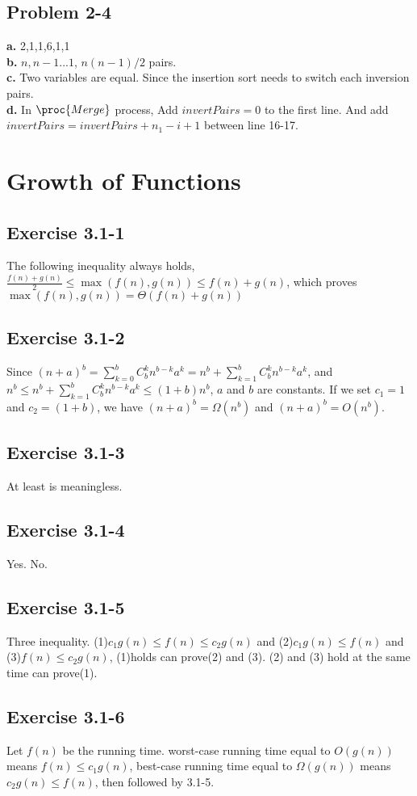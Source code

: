 \documentclass[12pt]{article}
\theoremstyle{definition}
\theoremstyle{remark}
\begin{document}
\subsection*{Problem 2-4}
\textbf{a.} 2,1,1,6,1,1\qquad \\
\textbf{b.} ${n,n-1...1}$, $n(n-1)/2$ pairs.\\
\textbf{c.} Two variables are equal. Since the insertion sort needs to switch each inversion pairs.\\
\textbf{d.} In $\proc{Merge}$ process, Add $invertPairs=0$ to the first line. And add $invertPairs=invertPairs+n_1-i+1$ between line 16-17.
\section{Growth of Functions}
\subsection*{Exercise 3.1-1}
The following inequality always holds, $\frac{f(n)+g(n)}{2}\le \max(f(n),g(n))\le f(n)+g(n)$, which proves $\max(f(n),g(n))=\Theta(f(n)+g(n))$
\subsection*{Exercise 3.1-2}
Since $(n+a)^b=\sum\limits_{k=0}^b C^k_b n^{b-k}a^k=n^b+\sum\limits_{k=1}^b C^k_b n^{b-k}a^k$, and $n^b\le n^b+\sum\limits_{k=1}^b C^k_b n^{b-k}a^k\le (1+b)n^b$, $a$ and $b$ are constants. If we set $c_1=1$ and $c_2=(1+b)$, we have $(n+a)^b=\Omega(n^b)$ and $(n+a)^b=O(n^b)$.
\subsection*{Exercise 3.1-3}
At least is meaningless.
\subsection*{Exercise 3.1-4}
Yes. No.
\subsection*{Exercise 3.1-5}
Three inequality. (1)$c_1g(n)\le f(n)\le c_2g(n)$ and (2)$c_1g(n)\le f(n)$ and (3)$f(n)\le c_2g(n)$, (1)holds can prove(2) and (3). (2) and (3) hold at the same time can prove(1).
\subsection*{Exercise 3.1-6}
Let $f(n)$ be the running time. worst-case running time equal to $O(g(n))$ means $f(n)\le c_1g(n)$, best-case running time equal to $\Omega(g(n))$ means $c_2g(n)\le f(n)$, then followed by 3.1-5.
\end{document}

